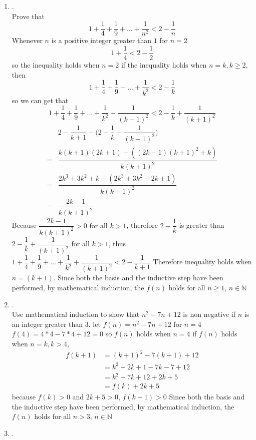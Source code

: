 \documentclass{article}
\theoremstyle{definition}
\theoremstyle{plain}
\begin{document}
\begin {enumerate}[itemindent=30pt,label=\bf Exercise {\arabic*}:]
\item .\\
Prove that $$1 + \dfrac{1}{4} + \dfrac{1}{9} + \ldots + \dfrac{1}{n^2} < 2 - \dfrac{1}{n}$$
Whenever $n$ is a positive integer greater than $1$
\subitem for $n = 2$ $$1 + \dfrac{1}{4} < 2 - \dfrac{1}{2}$$
\subitem so the inequality holds when $n = 2$
\subitem if the inequality holds when $n = k, k \geq 2$, then
$$1 + \dfrac{1}{4} + \dfrac{1}{9} + \ldots + \dfrac{1}{k^2} < 2 - \dfrac{1}{k}$$
\subitem so we can get that $$1 + \dfrac{1}{4} + \dfrac{1}{9} + \ldots + \dfrac{1}{k^2} + \dfrac{1}{(k+1)^2} < 2 - \dfrac{1}{k} + \dfrac{1}{(k+1)^2}$$
\begin{align*}
	&2 - \dfrac{1}{k+1} - \bigg (2 - \dfrac{1}{k} + \dfrac{1}{(k+1)^2}\bigg)\\
   =&\dfrac{k(k+1)(2k+1) - ((2k-1)(k+1)^2 + k)}{k(k + 1)^2}\\
   =&\dfrac{2k^3 + 3k^2 + k - (2k^3 + 3k^2 -2k + 1)}{k(k + 1)^2}\\
   =&\dfrac{2k - 1}{k(k + 1)^2}
\end{align*}
\subitem Because $\dfrac{2k - 1}{k(k + 1)^2 } > 0 \text{ for all }k > 1$, therefore $2 - \dfrac{1}{k}$ is greater than $2 - \dfrac{1}{k} + \dfrac{1}{(k+1)^2}$ for all $k > 1$, thus $1 + \dfrac{1}{4} + \dfrac{1}{9} + \ldots + \dfrac{1}{k^2} + \dfrac{1}{(k+1)^2} < 2 - \dfrac{1}{k+1}$
\subitem Therefore inequality holds when $n=(k + 1)$.
\subitem Since both the basis and the inductive step have been performed, by mathematical induction, the $f(n)$ holds for all $n \geq 1$, $n \in \mathbb{N}$
\item . \\Use mathematical induction to show that $n^2-7n+12$ is non negative if $n$ is an integer greater than $3$.
\subitem let $f(n) = n^2-7n+12$
\subitem for $n = 4$ $f(4) = 4*4 - 7 * 4 + 12 = 0$
\subitem so $f(n)$ holds when $n =4$
\subitem if $f(n)$ holds when $n = k, k > 4$,
\begin{align*}
	f(k + 1) &= (k+1)^2 - 7(k+1) +12 \\
			 &= k^2 +2k +1 - 7k - 7 + 12 \\
			 &= k^2 - 7k + 12 + 2k  + 5\\
			 & = f(k) + 2k + 5
\end{align*}
\subitem because $f(k) > 0$ and $2k + 5 > 0$, $f(k+1) > 0$
\subitem Since both the basis and the inductive step have been performed, by mathematical induction, the $f(n)$ holds for all $n > 3$, $n \in \mathbb{N}$
\item .\\

\end{enumerate}
\end{document}

